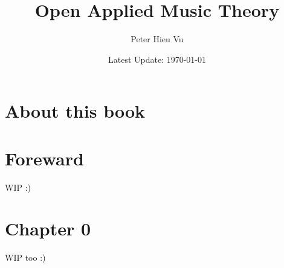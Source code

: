 \documentclass[12pt]{book}
\title{Open Applied Music Theory}
\author{Peter Hieu Vu}
\date{Latest Update: \today}
\newcommand\onlyinsubfile[1]{#1}
\newcommand\notinsubfile[1]{}
\begin{document}
    \renewcommand{\onlyinsubfile}[1]{}
    \renewcommand{\notinsubfile}[1]{#1}

    \maketitle

    \frontmatter
    \chapter{About this book}

    \tableofcontents

    \setcounter{page}{1}
        \chapter{Foreward}
        
    WIP :)

    \mainmatter
    \setcounter{page}{1}
        \chapter{Chapter 0}
        
    WIP too :)
    
\end{document}
